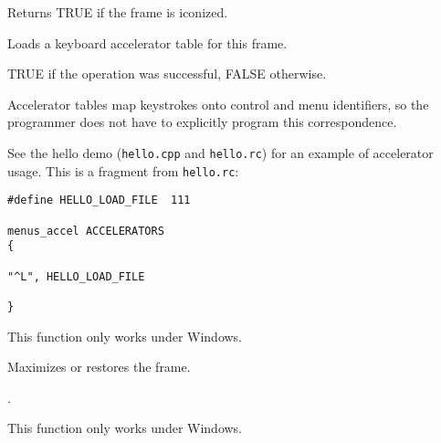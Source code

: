 
Returns TRUE if the frame is iconized.

\label{wxframeloadaccelerators}


Loads a keyboard accelerator table for this frame.




TRUE if the operation was successful, FALSE otherwise.


Accelerator tables map keystrokes onto control and menu identifiers, so the
programmer does not have to explicitly program this correspondence.

See the hello demo ({\tt hello.cpp} and {\tt hello.rc}) for
an example of accelerator usage. This is a fragment from {\tt hello.rc}:

\begin{verbatim}
#define HELLO_LOAD_FILE  111

menus_accel ACCELERATORS
{

"^L", HELLO_LOAD_FILE

}
\end{verbatim}

This function only works under Windows.


\label{wxframemaximize}


Maximizes or restores the frame.


.


This function only works under Windows.





